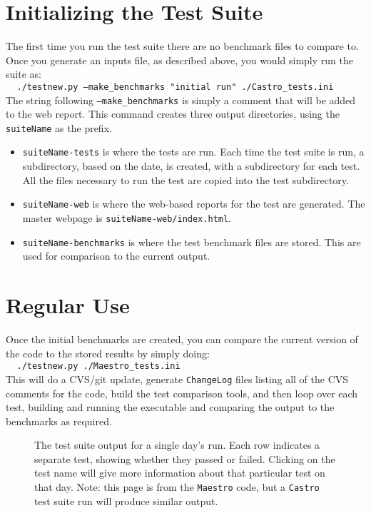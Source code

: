 \section{Initializing the Test Suite}

The first time you run the test suite there are no benchmark files to compare to.
Once you generate an inputs file, as described above, you would simply run the
suite as: \\
$~~~~~${\tt ./testnew.py --make\_benchmarks "initial run" ./Castro\_tests.ini} \\
The string following {\tt --make\_benchmarks} is simply a comment that will
be added to the web report.
This command creates three output directories, using the {\tt suiteName} as the prefix.
\begin{itemize}
\item {\tt suiteName-tests} is where the tests are run.  Each time the test
 suite is run, a subdirectory, based on the date, is created, with a subdirectory
 for each test.  All the files necessary to run the test are copied into the
 test subdirectory.

\item {\tt suiteName-web} is where the web-based reports for the test are generated.
 The master webpage is {\tt suiteName-web/index.html}.

\item {\tt suiteName-benchmarks} is where the test benchmark files are stored.  This
 are used for comparison to the current output.
\end{itemize}



\section{Regular Use}

Once the initial benchmarks are created, you can compare the current
version of the code to the stored results by simply doing: \\
$~~~~~${\tt ./testnew.py ./Maestro\_tests.ini} \\ 
This will do a CVS/git update, generate {\tt ChangeLog} files listing all
of the CVS comments for the code, build the test comparison tools, and
then loop over each test, building and running the executable and
comparing the output to the benchmarks as required.

\begin{figure}[t]
\centering
\caption{\label{fig:test_suite_date} The test suite output for a
  single day's run.  Each row indicates a separate test, showing
  whether they passed or failed.  Clicking on the test name will give
  more information about that particular test on that day. Note: this
  page is from the {\tt Maestro} code, but a {\tt Castro} test suite
  run will produce similar output.}
\end{figure}

